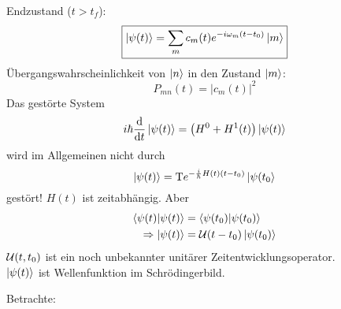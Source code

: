 	Endzustand ($t>t_f$):
		\begin{equation*}
			\boxed{ \ket{\psi(t)} = 
			\sum_m c_m(t) e^{-i \omega_m (t-t_0)} \ket{m}
			}
		\end{equation*}
	Übergangswahrscheinlichkeit von $\ket{n}$ in den Zustand $\ket{m}$:
		\begin{equation*}
			\boxed{P_{mn} (t) = |c_m(t)|^2}
		\end{equation*}
	Das gestörte System
		\begin{equation*}
			i \hbar \frac{\mathrm{d}}{\mathrm{d} t} \ket{\psi(t)}
			= \left( H^0 + H^1(t) \right) \ket{\psi(t)}
		\end{equation*}
	wird im Allgemeinen nicht durch
		\begin{equation*}
			\ket{\psi(t)} = \text{T} e^{-\frac{i}{\hbar} H(t) (t-t_0)} \ket{\psi(t_0}
		\end{equation*}
	gestört! $H(t)$ ist zeitabhängig.
	Aber 
		\begin{align*}
			\braket{\psi(t) | \psi(t)} &= \braket{\psi(t_0) | \psi(t_0)} \\
			\Rightarrow \ket{\psi(t)} &= \mathcal{U}(t-t_0) \ket{\psi(t_0)}
		\end{align*}
	$\mathcal{U}(t,t_0)$ ist ein noch unbekannter unitärer Zeitentwicklungsoperator.\\
	$\ket{\psi(t)}$ ist Wellenfunktion im Schrödingerbild.
	
	Betrachte: